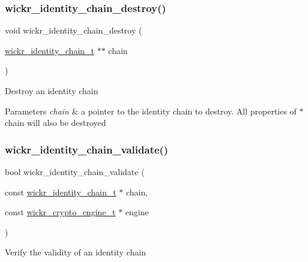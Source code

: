 \subsubsection{\texorpdfstring{wickr\+\_\+identity\+\_\+chain\+\_\+destroy()}{wickr\_identity\_chain\_destroy()}}
{\footnotesize\ttfamily void wickr\+\_\+identity\+\_\+chain\+\_\+destroy (\begin{DoxyParamCaption}\item[{\mbox{\hyperlink{structwickr__identity__chain}{wickr\+\_\+identity\+\_\+chain\+\_\+t}} $\ast$$\ast$}]{chain }\end{DoxyParamCaption})}

Destroy an identity chain


\begin{DoxyParams}{Parameters}
{\em chain} & a pointer to the identity chain to destroy. All properties of \textquotesingle{}$\ast$chain\textquotesingle{} will also be destroyed \\
\hline
\end{DoxyParams}
\mbox{\label{group__wickr__identity_ga12f5b33c4947b6a2ca3df3bdaacafa10}} 
\subsubsection{\texorpdfstring{wickr\+\_\+identity\+\_\+chain\+\_\+validate()}{wickr\_identity\_chain\_validate()}}
{\footnotesize\ttfamily bool wickr\+\_\+identity\+\_\+chain\+\_\+validate (\begin{DoxyParamCaption}\item[{const \mbox{\hyperlink{structwickr__identity__chain}{wickr\+\_\+identity\+\_\+chain\+\_\+t}} $\ast$}]{chain,  }\item[{const \mbox{\hyperlink{structwickr__crypto__engine}{wickr\+\_\+crypto\+\_\+engine\+\_\+t}} $\ast$}]{engine }\end{DoxyParamCaption})}

Verify the validity of an identity chain


